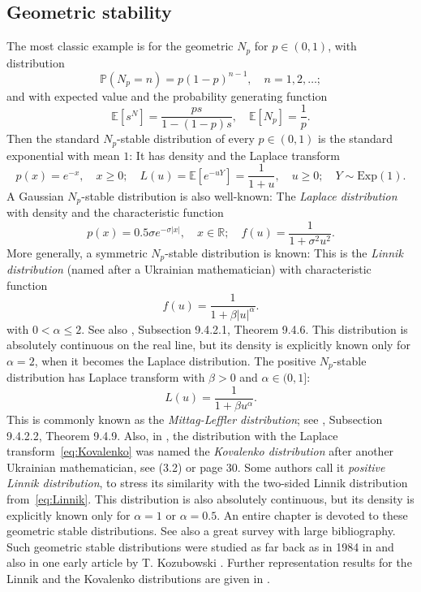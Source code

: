 \documentclass[12pt]{amsart}
\theoremstyle{remark}
\theoremstyle{definition}
\begin{document}
\subsection{Geometric stability} The most classic example is for the geometric $N_p$ for $p \in (0, 1)$, with distribution 
\begin{equation}
\label{eq:geometric}
\mathbb P(N_p = n) = p(1-p)^{n-1},\quad n = 1, 2, \ldots;
\end{equation}
and with expected value and the probability generating function
\begin{equation}
\label{eq:geometric-PGF}
\mathbb E[s^N] = \frac{ps}{1 - (1-p)s},\quad \mathbb E[N_p] = \frac1p.
\end{equation}
Then the standard $N_p$-stable distribution of every $p \in (0, 1)$ is the standard exponential with mean $1$: It has density and the Laplace transform 
\begin{equation}
\label{eq:exp-density}
p(x) = e^{-x},\quad x \ge 0;\quad L(u) = \mathbb E[e^{-uY}] = \frac{1}{1+u},\quad u \ge 0;\quad Y \sim \mathrm{Exp}(1). 
\end{equation}
A Gaussian $N_p$-stable distribution is also well-known: The {\it Laplace distribution} with density and the characteristic function
$$
p(x) = 0.5\sigma e^{-\sigma|x|},\quad x \in \mathbb R;\quad f(u) = \frac1{1 + \sigma^2u^2}.
$$
More generally, a symmetric $N_p$-stable distribution is known: This is the {\it Linnik distribution} (named after a Ukrainian mathematician) with characteristic function 
\begin{equation}
\label{eq:Linnik}
f(u) = \frac1{1 + \beta |u|^{\alpha}}.
\end{equation}
with $0 < \alpha \le 2$. See also \cite[Chapter 9]{KKRbook}, Subsection 9.4.2.1, Theorem 9.4.6. This distribution is absolutely continuous on the real line, but its density is explicitly known only for $\alpha = 2$, when it becomes the Laplace distribution. The positive $N_p$-stable distribution has Laplace transform with $\beta > 0$ and 
$\alpha \in (0, 1]$:
\begin{equation}
\label{eq:Kovalenko}
L(u) = \frac1{1 + \beta u^{\alpha}}.
\end{equation}
This is commonly known as the {\it Mittag-Leffler distribution}; see \cite[Chapter 9]{KKRbook}, Subsection 9.4.2.2, Theorem 9.4.9. Also, in \cite[Chapter 2]{GnedenkoBook}, the distribution with the Laplace transform~\eqref{eq:Kovalenko} was named the {\it Kovalenko distribution} after another Ukrainian mathematician, see (3.2) or page 30. Some authors call it {\it positive Linnik distribution}, to stress its similarity with the two-sided Linnik distribution from~\eqref{eq:Linnik}. This distribution is also absolutely continuous, but its density is explicitly known only for $\alpha = 1$ or $\alpha = 0.5$. An entire chapter \cite[Chapter 9]{KKRbook} is devoted to these geometric stable distributions. See also a great survey \cite{Koz1} with large bibliography. Such geometric stable distributions were studied as far back as in 1984 in \cite{Zolotarev} and also in one early article by T. Kozubowski \cite{Koz1994}. Further representation results for the Linnik and the Kovalenko distributions are given in \cite{KorolevZeifman}.
\end{document}
